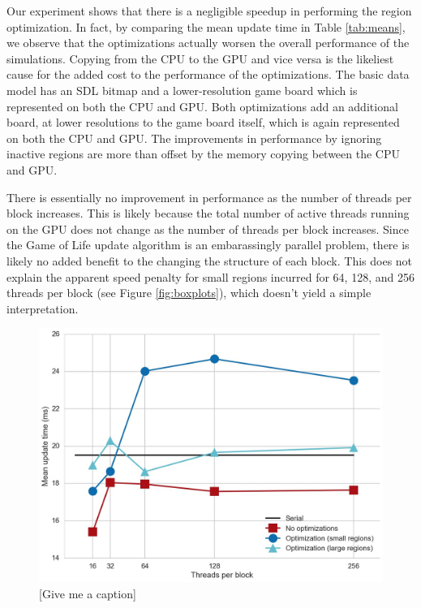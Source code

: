 \documentclass[12pt]{article}
\begin{document}
    Our experiment shows that there is a negligible speedup in performing the
    region optimization. In fact, by comparing the mean update time in Table
    \ref{tab:means}, we observe that the optimizations actually worsen the
    overall performance of the simulations. Copying from the CPU to the GPU and
    vice versa is the likeliest cause for the added cost to the performance of
    the optimizations. The basic data model has an SDL bitmap and a
    lower-resolution game board which is represented on both the CPU and GPU.
    Both optimizations add an additional board, at lower resolutions to the
    game board itself, which is again represented on both the CPU and GPU. The
    improvements in performance by ignoring inactive regions are more than
    offset by the memory copying between the CPU and GPU.

    There is essentially no improvement in performance as the number of threads
    per block increases. This is likely because the total number of active
    threads running on the GPU does not change as the number of threads per
    block increases. Since the Game of Life update algorithm is an
    embarassingly parallel problem, there is likely no added benefit to the
    changing the structure of each block. This does not explain the apparent
    speed penalty for small regions incurred for 64, 128, and 256 threads per
    block (see Figure \ref{fig:boxplots}), which doesn't yield a simple
    interpretation.
    

    \begin{figure}[t]
        \centering
        \includegraphics[width=\textwidth]{../images/plot.jpg}
        \caption{[Give me a caption]}
        \label{fig:means}
    \end{figure}
\end{document}
